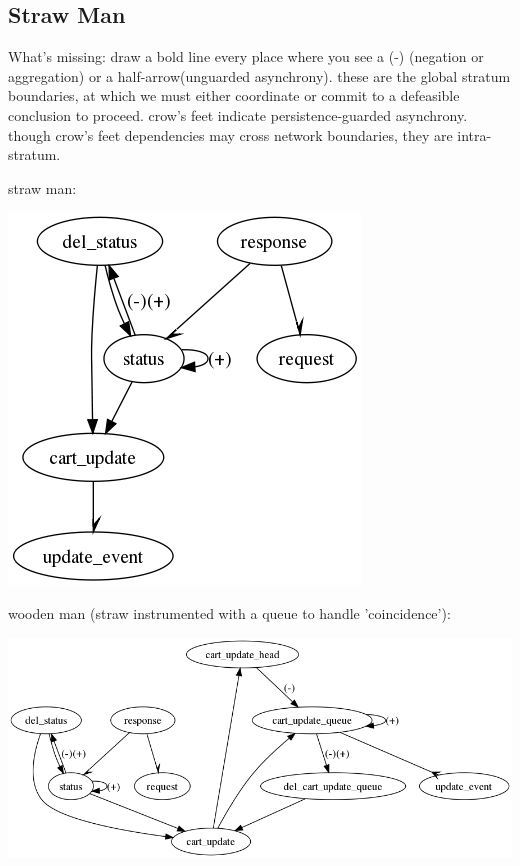 \subsection{Straw Man}

What's missing: draw a bold line every place where you see a (-) (negation or aggregation)
or a half-arrow(unguarded asynchrony).  these are the global stratum boundaries, at which
we must either coordinate or commit to a defeasible conclusion to proceed.
crow's feet indicate persistence-guarded asynchrony.  though crow's feet dependencies
may cross network boundaries, they are intra-stratum.

straw man:


\includegraphics[width=0.65\linewidth]{vizza_straw.png}


wooden man (straw instrumented with a queue to handle 'coincidence'):


\includegraphics[width=1.2\linewidth]{vizza_wood.png}



